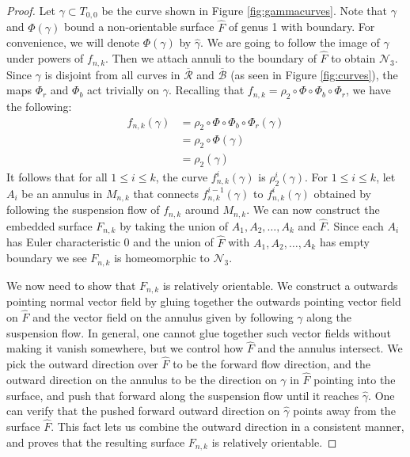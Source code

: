 \begin{proof}
  Let $\gamma \subset T_{0,0}$ be the curve shown in Figure \ref{fig:gammacurves}. Note that $\gamma$ and $\Phi(\gamma)$ bound a non-orientable surface
  $\hat{F}$ of genus 1 with boundary. For convenience, we will denote $\Phi(\gamma)$ by $\widehat{\gamma}$. We are going to follow the image of $\gamma$
  under powers of $f_{n,k}$.  Then we attach annuli to the
  boundary of $\widehat{F}$ to obtain $\mathcal{N}_3$. Since $\gamma$ is disjoint from all curves in $\overline{\mathcal{R}}$ and $\overline{\mathcal{B}}$ (as seen in Figure \ref{fig:curves}), the maps $\Phi_r$ and $\Phi_b$ act trivially on $\gamma$.  Recalling that $f_{n,k}=\rho_2\circ\Phi\circ\Phi_b\circ\Phi_r$, we have the following:
  \begin{align*}
    f_{n,k}(\gamma) &= \rho_2 \circ \Phi \circ \Phi_b \circ \Phi_r(\gamma) \\
                    &= \rho_2 \circ \Phi(\gamma) \\
                    &= \rho_2(\widehat{\gamma}) %
  \end{align*}
  It follows that for all $1\leq i\leq k$, the curve $f_{n,k}^i(\gamma)$ is $\rho_2^i(\gamma)$.  
  For $1\leq i\leq k$, let $A_i$ be an annulus in $M_{n,k}$ that connects $f_{n,k}^{i-1}(\gamma)$ to $f_{n,k}^i(\gamma)$ obtained by following the suspension
  flow of $f_{n,k}$ around $M_{n,k}$. We can now construct the embedded surface $F_{n,k}$ by taking the union of
  $A_1,A_2,\dots,A_k$ and $\hat{F}$. Since each $A_i$ has Euler characteristic 0 and the union of $\hat{F}$ with $A_1,A_2,\dots, A_k$ has empty boundary we see $F_{n,k}$ is homeomorphic to $\mathcal{N}_3$.


We now need to show that $F_{n,k}$ is relatively orientable. We construct a outwards pointing normal vector field by gluing together the outwards pointing vector field on $\widehat{F}$ and the vector field on the annulus given by following $\gamma$ along the suspension flow.
In general, one cannot glue together such vector fields without making it vanish somewhere, but we control how $\widehat{F}$ and the annulus intersect.
We pick the outward direction over $\widehat{F}$ to be the forward flow direction, and the outward direction on the annulus to be the direction on $\gamma$ in $\widehat{F}$ pointing into the surface, and push that forward along the suspension flow until it reaches $\widehat{\gamma}$. One can verify that the pushed forward outward direction on $\widehat{\gamma}$ points away from the surface $\widehat{F}$. This fact lets us combine the outward direction in a consistent manner, and proves that the resulting surface $F_{n,k}$ is relatively orientable.


\end{proof}
